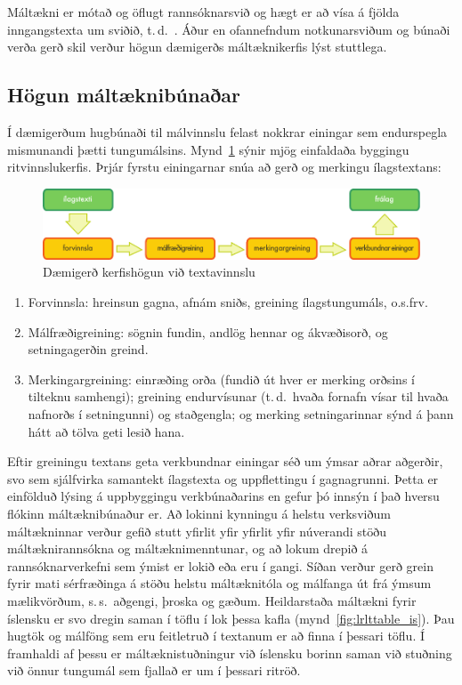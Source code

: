 \begin{multicols}{2}
Máltækni er mótað og öflugt rannsóknarsvið og hægt er að vísa á fjölda inngangstexta um sviðið, t.\,d.~\cite{carstensen-etal1, jurafsky-martin01, manning-schuetze1, lt-world1, lt-survey1}.
%
Áður en ofannefndum notkunarsviðum og búnaði verða gerð skil verður högun dæmigerðs máltæknikerfis lýst stuttlega.

\subsection{Högun máltæknibúnaðar}

Í dæmigerðum hugbúnaði til málvinnslu felast nokkrar einingar sem endurspegla mismunandi þætti tungumálsins. Mynd~\ref{fig:textprocessingarch_is} sýnir mjög einfaldaða byggingu ritvinnslukerfis. Þrjár fyrstu einingarnar snúa að gerð og merkingu ílagstextans: 

\begin{figure}[b]
  \center
  \includegraphics[width=\textwidth]{../_media/icelandic/text_processing_app_architecture}
  \caption{Dæmigerð kerfishögun við textavinnslu}
  \label{fig:textprocessingarch_is}
\end{figure}

\begin{enumerate}
\item Forvinnsla: hreinsun gagna, afnám sniðs, greining ílagstungumáls, o.s.frv.
\item Málfræðigreining: sögnin fundin, andlög hennar og ákvæðisorð, og setningagerðin greind.
\item Merkingargreining: einræðing orða (fundið út hver er merking orðsins í tilteknu samhengi); greining endurvísunar (t.\,d.~hvaða fornafn vísar til hvaða nafnorðs í setningunni) og staðgengla; og merking setningarinnar sýnd á þann hátt að tölva geti lesið hana.
\end{enumerate}

Eftir greiningu textans geta verkbundnar einingar séð um ýmsar aðrar aðgerðir, svo sem sjálfvirka samantekt ílagstexta og uppflettingu í gagnagrunni. Þetta er einfölduð lýsing á uppbyggingu verkbúnaðarins en gefur þó innsýn í það hversu flókinn máltæknibúnaður er. Að lokinni kynningu á helstu verksviðum máltækninnar verður gefið stutt yfirlit yfir yfirlit yfir núverandi stöðu máltæknirannsókna og máltæknimenntunar, og að lokum drepið á rannsóknarverkefni sem ýmist er lokið eða eru í gangi. Síðan verður gerð grein fyrir mati sérfræðinga á stöðu helstu máltæknitóla og málfanga út frá ýmsum mælikvörðum, s.\,s.~aðgengi, þroska og gæðum. Heildarstaða máltækni fyrir íslensku er svo dregin saman í töflu í lok þessa kafla (mynd~\ref{fig:lrlttable_is}). Þau hugtök og málföng sem eru feitletruð í textanum er að finna í þessari töflu. Í framhaldi af þessu er máltæknistuðningur við íslensku borinn saman við stuðning við önnur tungumál sem fjallað er um í þessari ritröð.


\end{multicols}
